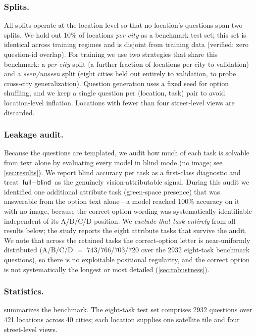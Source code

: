 \documentclass[runningheads]{llncs}
\begin{document}
\subsubsection{Splits.}
All splits operate at the location level so that no location's questions span
two splits. We hold out \num{10}\% of locations \emph{per city} as a benchmark
test set; this set is identical across training regimes and is disjoint from
training data (verified: zero question-id overlap). For training we use two
strategies that share this benchmark: a \emph{per-city} split (a further fraction
of locations per city to validation) and a \emph{seen/unseen} split (eight cities
held out entirely to validation, to probe cross-city generalization). Question
generation uses a fixed seed for option shuffling, and we keep a single question
per (location, task) pair to avoid location-level inflation. Locations with fewer
than four street-level views are discarded.

\subsubsection{Leakage audit.}
Because the questions are templated, we audit how much of each task is solvable
from text alone by evaluating every model in \textsf{blind} mode (no image; see
\cref{sec:results}). We report \textsf{blind} accuracy per task as a first-class
diagnostic and treat $\textsf{full}-\textsf{blind}$ as the genuinely
vision-attributable signal. During this audit we identified one additional
attribute task (green-space presence) that was answerable from the option text
alone---a model reached \num{100}\% accuracy on it with no image, because the
correct option wording was systematically identifiable independent of its A/B/C/D
position. We \emph{exclude that task entirely} from all results below; the study
reports the eight attribute tasks that survive the audit. We note that across the
retained tasks the correct-option letter is near-uniformly distributed
(A/B/C/D $=$ \num{743}/\num{766}/\num{703}/\num{720} over the \num{2932}
eight-task benchmark questions), so there is no exploitable positional
regularity, and the correct option is not systematically the longest or most
detailed (\cref{sec:robustness}).

\subsubsection{Statistics.}
 summarizes the benchmark. The eight-task test set comprises
\num{2932} questions over \num{421} locations across \num{40} cities; each
location supplies one satellite tile and four street-level views.
\end{document}
